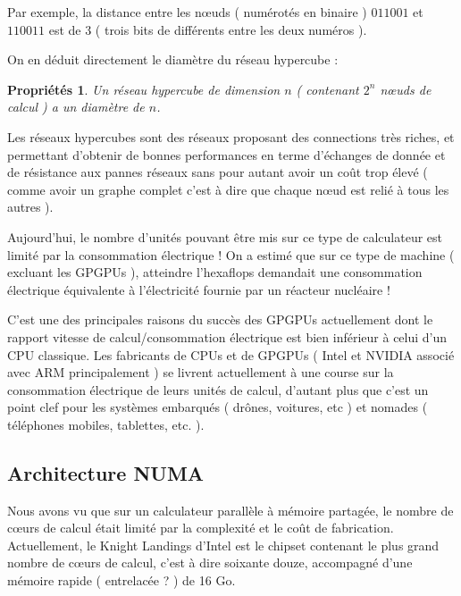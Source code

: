 \documentclass[fleqn,11pt]{article}
\newtheorem{prop}{Propriétés }
\begin{document}
\begin{itemize}
\begin{itemize}
Par exemple, la distance entre les nœuds ( numérotés en binaire ) $011001$ et $110011$ est de 3 ( trois bits
de différents entre les deux numéros ).

On en déduit directement le diamètre du réseau hypercube :

\begin{prop}
Un réseau hypercube de dimension $n$ ( contenant $2^{n}$ nœuds de calcul ) a un diamètre de $n$.
\end{prop}

Les réseaux hypercubes sont des réseaux proposant des connections très riches,
et permettant d'obtenir de bonnes performances en terme d'échanges de donnée
et de résistance aux pannes réseaux sans pour autant avoir un coût trop élevé 
( comme avoir un graphe complet c'est à dire que chaque nœud est relié à tous les autres ).

\end{itemize}



Aujourd'hui, le nombre d'unités pouvant être mis sur ce type de calculateur 
est limité par la consommation électrique !  
On a estimé que sur ce type de machine ( excluant les GPGPUs ), atteindre l'hexaflops demandait une consommation  électrique équivalente à l'électricité fournie par un réacteur nucléaire ! 

C'est une des principales raisons du succès des GPGPUs actuellement dont le rapport vitesse de calcul/consommation électrique est bien inférieur à celui d'un CPU classique. Les fabricants de CPUs et de GPGPUs ( Intel et NVIDIA associé avec ARM principalement ) se livrent 
actuellement à une course sur la consommation électrique de leurs unités de calcul, d'autant plus que c'est un point clef pour les systèmes embarqués  
( drônes, voitures, etc ) et nomades ( téléphones mobiles, tablettes, etc. ).

\end{itemize}

\subsection{Architecture NUMA}

Nous avons vu que sur un calculateur parallèle à mémoire partagée,  le nombre de cœurs de calcul était limité par la complexité et le coût de fabrication. 
Actuellement, le Knight Landings d'Intel est le chipset contenant le plus grand nombre de cœurs de calcul, c'est à dire soixante douze, 
accompagné d'une mémoire rapide ( entrelacée ?  ) de 16 Go.
\end{document}
